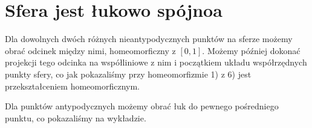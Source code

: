 \section*{Sfera jest łukowo spójnoa}
Dla dowolnych dwóch różnych nieantypodycznych punktów na sferze możemy obrać odcinek między nimi, homeomorficzny z $[0,1]$. Możemy później dokonać projekcji tego odcinka na współliniowe z nim i początkiem układu współrzędnych punkty sfery, co jak pokazaliśmy przy homeomorfizmie 1) z 6) jest przekształceniem homeomorficznym.

Dla punktów antypodycznych możemy obrać łuk do pewnego pośredniego punktu, co pokazaliśmy na wykładzie.
